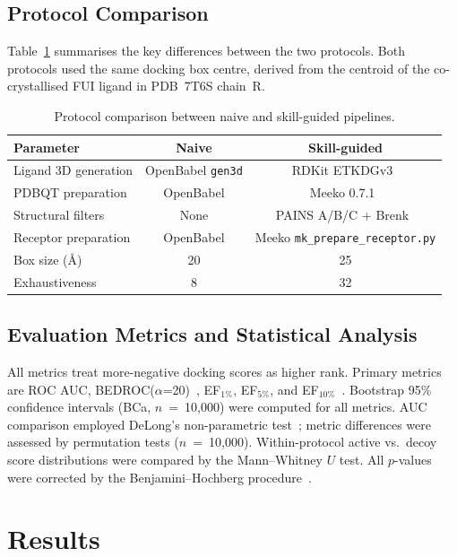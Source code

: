 \documentclass[10pt,a4paper,twocolumn]{article}
\begin{document}
\subsection*{Protocol Comparison}

Table~\ref{tab:protocols} summarises the key differences between the two protocols. Both protocols used the same docking box centre, derived from the centroid of the co-crystallised FUI ligand in PDB~7T6S chain~R.

\begin{table}[htbp]
\centering
\caption{Protocol comparison between naive and skill-guided pipelines.}
\label{tab:protocols}
\begin{tabular}{lcc}
\toprule
\textbf{Parameter} & \textbf{Naive} & \textbf{Skill-guided} \\
\midrule
Ligand 3D generation & OpenBabel \texttt{gen3d} & RDKit ETKDGv3~\citep{etkdgv3_2020} \\
PDBQT preparation & OpenBabel & Meeko 0.7.1~\citep{meeko2023} \\
Structural filters & None & PAINS A/B/C + Brenk~\citep{pains2010,brenk2008} \\
Receptor preparation & OpenBabel & Meeko \texttt{mk\_prepare\_receptor.py} \\
Box size (\AA) & 20 & 25 \\
Exhaustiveness & 8 & 32 \\
\bottomrule
\end{tabular}
\end{table}

\subsection*{Evaluation Metrics and Statistical Analysis}

All metrics treat more-negative docking scores as higher rank. Primary metrics are ROC AUC, BEDROC($\alpha$=20)~\citep{bedroc2007}, EF$_{1\%}$, EF$_{5\%}$, and EF$_{10\%}$~\citep{huang2006}. Bootstrap 95\% confidence intervals (BCa, $n$~=~10,000) were computed for all metrics. AUC comparison employed DeLong's non-parametric test~\citep{delong1988}; metric differences were assessed by permutation tests ($n$~=~10,000). Within-protocol active vs.\ decoy score distributions were compared by the Mann--Whitney $U$ test. All $p$-values were corrected by the Benjamini--Hochberg procedure~\citep{bh1995}.

\section*{Results}
\end{document}

